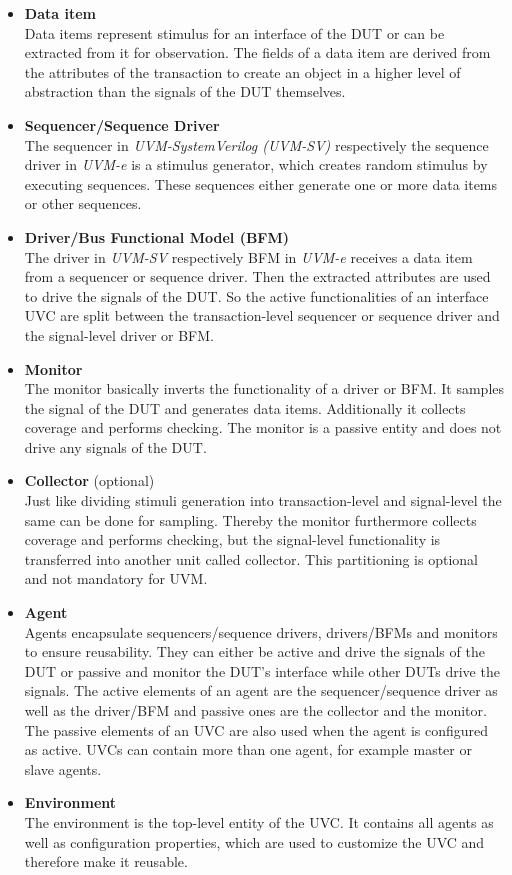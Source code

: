 \begin{itemize}
  \item \textbf{Data item}\\
  Data items represent stimulus for an interface of the
  DUT or can be extracted from it for observation.
  The fields of a data item are derived from the attributes of the transaction
  to create an object in a higher level of abstraction than the signals of the
  DUT themselves.
  \item \textbf{Sequencer/Sequence Driver}\\
  The sequencer in \emph{UVM-SystemVerilog (UVM-SV)} respectively the sequence
  driver in \emph{UVM-e} is a stimulus generator, which creates random
  stimulus by executing sequences. These sequences either generate one or more
  data items or other sequences.
  \item \textbf{Driver/Bus Functional Model (BFM)}\\
  The driver in \emph{UVM-SV} respectively BFM in \emph{UVM-e} receives a data
  item from a sequencer or sequence driver. Then the extracted attributes are
  used to drive the signals of the DUT. So the active functionalities of an
  interface UVC are split between the transaction-level sequencer or sequence
  driver and the signal-level driver or BFM.
  \item \textbf{Monitor}\\
  The monitor basically inverts the functionality of a driver or BFM. It samples
  the signal of the DUT and generates data items. Additionally it collects coverage
  and performs checking. The monitor is a passive entity and does not drive any
  signals of the DUT.
  \item \textbf{Collector} (optional)\\
  Just like dividing stimuli generation into transaction-level and signal-level
  the same can be done for sampling. Thereby the monitor furthermore collects
  coverage and performs checking, but the signal-level functionality is
  transferred into another unit called collector. This partitioning is optional
  and not mandatory for UVM.
  \item \textbf{Agent}\\
  Agents encapsulate sequencers/sequence drivers, drivers/BFMs and monitors to
  ensure reusability. They can either be active and drive the signals of the DUT
  or passive and monitor the DUT's interface while other DUTs drive the
  signals. The active elements of an agent are the sequencer/sequence driver as
  well as the driver/BFM and passive ones are the collector and the monitor. The
  passive elements of an UVC are also used when the agent is configured as
  active. UVCs can contain more than one agent, for example master or slave
  agents.
  \item \textbf{Environment}\\
  The environment is the top-level entity of the UVC. It contains all agents as
  well as configuration properties, which are used to customize the UVC and
  therefore make it reusable.
\end{itemize}

